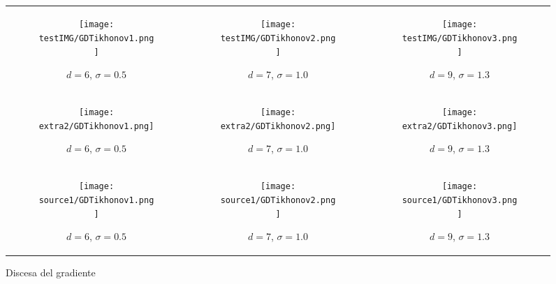 \documentclass{article}
\begin{document}
\
\begin{figure}[h]
\begin{tabular}{c c c}
    \begin{subfigure}{0.36\textwidth}
    \texttt{[image: testIMG/GDTikhonov1.png]}
    \caption{$d=6$, $\sigma=0.5$}
    \label{fig:first}
\end{subfigure} & \begin{subfigure}{0.3\textwidth}
    \texttt{[image: testIMG/GDTikhonov2.png]}
        \caption{$d=7$, $\sigma=1.0$}
    \label{fig:second}
\end{subfigure}  & \begin{subfigure}{0.3\textwidth}
    \texttt{[image: testIMG/GDTikhonov3.png]}
        \caption{$d=9$, $\sigma=1.3$}
    \label{fig:third}
\end{subfigure}  \\

\begin{subfigure}{0.3\textwidth}
    \texttt{[image: extra2/GDTikhonov1.png]}
    \caption{$d=6$, $\sigma=0.5$}
    \label{fig:first}
\end{subfigure}     & \begin{subfigure}{0.3\textwidth}
    \texttt{[image: extra2/GDTikhonov2.png]}
        \caption{$d=7$, $\sigma=1.0$}
    \label{fig:second}
\end{subfigure} & \begin{subfigure}{0.3\textwidth}
    \texttt{[image: extra2/GDTikhonov3.png]}
        \caption{$d=9$, $\sigma=1.3$}
    \label{fig:third}
\end{subfigure}  \\
     
 \begin{subfigure}{0.25\textwidth}
    \texttt{[image: source1/GDTikhonov1.png]}
    \caption{$d=6$, $\sigma=0.5$}
    \label{fig:first}
\end{subfigure}     &  \begin{subfigure}{0.25\textwidth}
    \texttt{[image: source1/GDTikhonov2.png]}
        \caption{$d=7$, $\sigma=1.0$}
    \label{fig:second}
\end{subfigure}  & \begin{subfigure}{0.25\textwidth}
    \texttt{[image: source1/GDTikhonov3.png]}
        \caption{$d=9$, $\sigma=1.3$}
    \label{fig:third}
\end{subfigure}  \\
\end{tabular}
\caption{Discesa del gradiente}
\label{fig:figures}
\end{figure}
\end{document}
